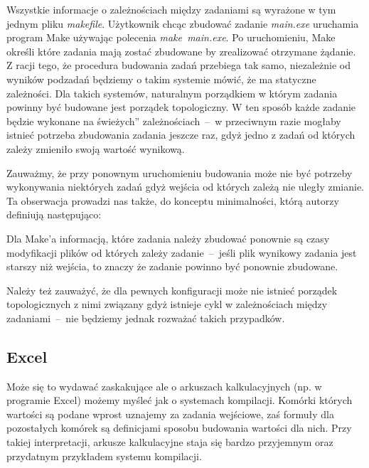 Wszystkie informacje o zależnościach między zadaniami są wyrażone w tym jednym pliku \textit{makefile}. Użytkownik chcąc zbudować zadanie \textit{main.exe} uruchamia program Make używając polecenia \textit{make~main.exe}. Po uruchomieniu, Make określi które zadania mają zostać zbudowane by zrealizować otrzymane żądanie. Z racji tego, że procedura budowania zadań przebiega tak samo, niezależnie od wyników podzadań będziemy o takim systemie mówić, że ma statyczne zależności. Dla takich systemów, naturalnym porządkiem w którym zadania powinny być budowane jest porządek topologiczny. W ten sposób każde zadanie będzie wykonane na świeżych'' zależnościach~--~w przeciwnym razie mogłaby istnieć potrzeba zbudowania zadania jeszcze raz, gdyż jedno z zadań od których zależy zmieniło swoją wartość wynikową.

Zauważmy, że przy ponownym uruchomieniu budowania może nie być potrzeby wykonywania niektórych zadań gdyż wejścia od których zależą nie uległy zmianie. Ta obserwacja prowadzi nas także, do konceptu minimalności, którą autorzy definiują następująco:


Dla Make'a informacją, które zadania należy zbudować ponownie są czasy modyfikacji plików od których zależy zadanie~--~jeśli plik wynikowy zadania jest starszy niż wejścia, to znaczy że zadanie powinno być ponownie zbudowane.

Należy też zauważyć, że dla pewnych konfiguracji może nie istnieć porządek topologicznych z nimi związany gdyż istnieje cykl w zależnościach między zadaniami~--~nie będziemy jednak rozważać takich przypadków.

\subsection{Excel}

Może się to wydawać zaskakujące ale o arkuszach kalkulacyjnych (np. w programie Excel) możemy myśleć jak o systemach kompilacji. Komórki których wartości są podane wprost uznajemy za zadania wejściowe, zaś formuły dla pozostałych komórek są definicjami sposobu budowania wartości dla nich. Przy takiej interpretacji, arkusze kalkulacyjne staja się bardzo przyjemnym oraz przydatnym przykładem systemu kompilacji.

